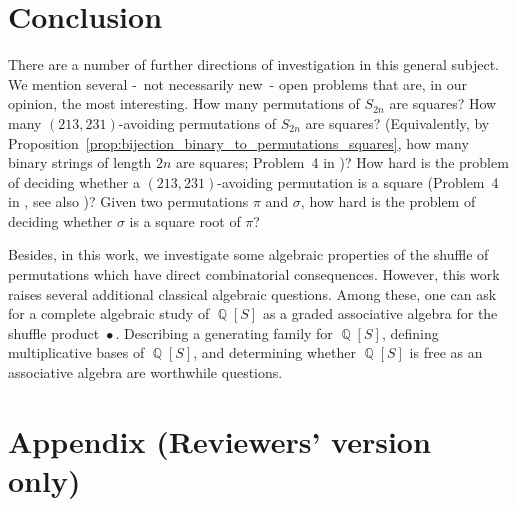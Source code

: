 \documentclass[a4paper]{llncs}
\DeclareMathOperator{\QQ}{\mathbb{Q}}
\DeclareMathOperator{\SHUFFLE}{\bullet}
\begin{document}


\section{Conclusion}
\label{section:Conclusion}

There are a number of further directions of investigation in this
general subject. We mention several -~not necessarily new~- open
problems that are, in our opinion, the most interesting. How many
permutations of $S_{2n}$ are squares? How many $(213,231)$-avoiding
permutations of $S_{2n}$ are squares? (Equivalently, by
Proposition~\ref{prop:bijection_binary_to_permutations_squares},
how many binary strings of length $2n$ are squares; Problem~4
in \cite{Henshall:Rampersad:Shallit:2011})? How hard is the problem of
deciding whether a $(213,231)$-avoiding permutation is a square
(Problem~4 in \cite{Henshall:Rampersad:Shallit:2011},
see also \cite{Buss:Soltys:2014,Rizzi:Vialette:CSR:2013})?
Given two permutations $\pi$ and $\sigma$, how hard is the problem of
deciding whether $\sigma$ is a square root of $\pi$?
\smallskip

Besides, in this work, we investigate some algebraic properties of the
shuffle of permutations which have direct combinatorial consequences.
However, this work raises several additional classical algebraic
questions. Among these, one can ask for a complete algebraic study of
$\QQ[S]$ as a graded associative algebra for the shuffle  product
$\SHUFFLE$. Describing a generating family for $\QQ[S]$, defining
multiplicative bases of $\QQ[S]$, and determining whether $\QQ[S]$ is
free as an associative algebra are worthwhile questions.







\newpage
\section*{Appendix (Reviewers' version only)}


\end{document}
